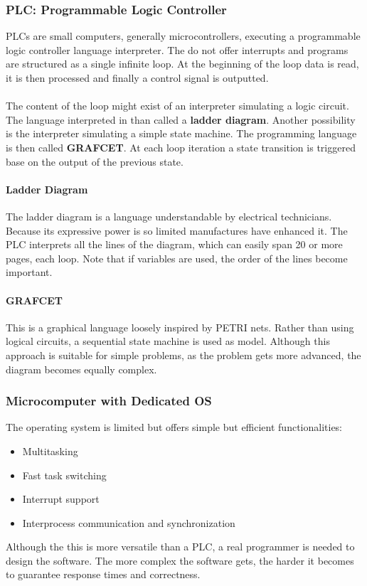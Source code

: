\documentclass[../main.tex]{subfiles}
\begin{document}
\subsubsection{PLC: Programmable Logic Controller}
PLCs are small computers, generally microcontrollers, executing a programmable logic controller language interpreter. The do not offer interrupts and programs are structured as a single infinite loop. At the beginning of the loop data is read, it is then processed and finally a control signal is outputted.
\\\\
The content of the loop might exist of an interpreter simulating a logic circuit. The language interpreted in than called a \textbf{ladder diagram}. Another possibility is the interpreter simulating a simple state machine. The programming language is then called \textbf{GRAFCET}. At each loop iteration a state transition is triggered base on the output of the previous state.

\paragraph{Ladder Diagram} 
The ladder diagram is a language understandable by electrical technicians. Because its expressive power is so limited manufactures have enhanced it. The PLC interprets all the lines of the diagram, which can easily span 20 or more pages, each loop. Note that if variables are used, the order of the lines become important.  

\paragraph{GRAFCET} This is a graphical language loosely inspired by PETRI nets. Rather than using logical circuits, a sequential state machine is used as model. Although this approach is suitable for simple problems, as the problem gets more advanced, the diagram becomes equally complex.

\subsubsection{Microcomputer with Dedicated OS}
The operating system is limited but offers simple but efficient functionalities:
\begin{itemize}
	\item Multitasking
	\item Fast task switching
	\item Interrupt support
	\item Interprocess communication and synchronization
\end{itemize}
Although the this is more versatile than a PLC, a real programmer is needed to design the software. The more complex the software gets, the harder it becomes to guarantee response times and correctness.
\end{document}
